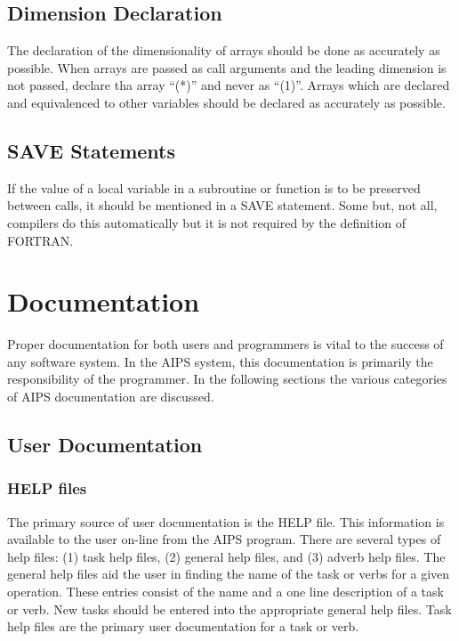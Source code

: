 \subsection {Dimension Declaration}

   The declaration of the dimensionality of arrays should be done as
accurately as possible.  When arrays are passed as call arguments and
the leading dimension is not passed, declare tha array ``(*)'' and
never as ``(1)''.  Arrays which are declared and equivalenced to other
variables should be declared as accurately as possible.

\subsection {SAVE Statements}

   If the value of a local variable in a subroutine or function is to
be preserved between calls, it should be mentioned in a SAVE
statement.  Some but, not all, compilers do this automatically but it
is not required by the definition of FORTRAN.

\section{Documentation }
Proper documentation for both users and programmers is vital to the
success of any software system.  In the AIPS system, this
documentation is primarily the responsibility of the programmer.  In
the following sections the various categories of AIPS documentation
are discussed.


\subsection{User Documentation }
\subsubsection{HELP files }
The primary source of user documentation is the HELP file.  This
information is available to the user on-line from the AIPS program.
There are several types of help files: (1) task help files, (2)
general help files, and (3) adverb help files.  The general help files
aid the user in finding the name of the task or verbs for a given
operation. These entries consist of the name and a one line
description of a task or verb.  New tasks should be entered into the
appropriate general help files.  Task help files are the primary user
documentation for a task or verb.

